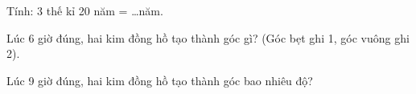 \begin{ex}
Tính: 3 thế kỉ 20 năm = \dots năm.
\end{ex}

\begin{ex}
Lúc 6 giờ đúng, hai kim đồng hồ tạo thành góc gì? (Góc bẹt ghi 1, góc vuông ghi 2).
\end{ex}

\begin{ex}
Lúc 9 giờ đúng, hai kim đồng hồ tạo thành góc bao nhiêu độ?
\end{ex}
